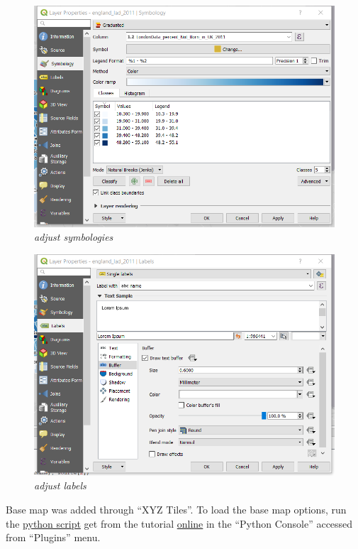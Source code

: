 \documentclass[]{article}
\begin{document}
\begin{figure}
\centering
\includegraphics{Part1/pngs/display_data.png}
\caption{\emph{adjust symbologies}}
\end{figure}

\begin{figure}
\centering
\includegraphics{Part1/pngs/label.png}
\caption{\emph{adjust labels}}
\end{figure}

Base map was added through ``XYZ Tiles''. To load the base map options,
run the
\href{https://raw.githubusercontent.com/klakar/QGIS_resources/master/collections/Geosupportsystem/python/qgis_basemaps.py}{python
script} get from the tutorial
\href{https://opengislab.com/blog/2018/4/15/add-basemaps-in-qgis-30}{online}
in the ``Python Console'' accessed from ``Plugins'' menu.
\end{document}
